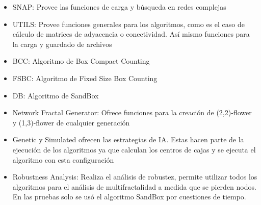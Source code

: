 \begin{itemize}
    \item SNAP: Provee las funciones de carga y búsqueda en redes complejas
    \item UTILS: Provee funciones generales para los algoritmos, como es el caso de cálculo de matrices de adyacencia o conectividad. Así mismo funciones para la carga y guardado de archivos
    \item BCC: Algoritmo de Box Compact Counting
    \item FSBC: Algoritmo de Fixed Size Box Counting
    \item DB: Algoritmo de SandBox
    \item Network Fractal Generator: Ofrece funciones para la creación de (2,2)-flower y (1,3)-flower de cualquier generación
    \item Genetic y Simulated ofrecen las estrategias de IA. Estas hacen parte de la ejecución de los algoritmos ya que calculan los centros de cajas y se ejecuta el algoritmo con esta configuración
    \item Robustness Analysis: Realiza el análisis de robustez, permite utilizar todos los algoritmos para el análisis de multifractalidad a medida que se pierden nodos. En las pruebas solo se usó el algoritmo SandBox por cuestiones de tiempo.
\end{itemize}